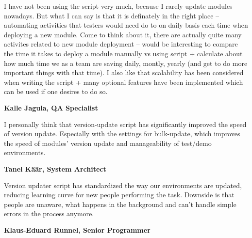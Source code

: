 \documentclass[12pt]{article}
\begin{document}
  \begin{displayquote}
  I have not been using the script very much, because I rarely update modules nowadays. But what I can say is that it is definately in the right place – automating activities that testers would need do to on daily basis each time when deploying a new module. Come to think about it, there are actually quite many activites related to new module deployment – would be interesting to compare the time it takes to deploy a module manually vs using script + calculate about how much time we as a team are saving daily, montly, yearly (and get to do more important things with that time).
I also like that scalability has been considered when writing the script + many optional features have been implemented which can be used if one desires to do so.
  \end{displayquote}

  \textbf{Kalle Jagula, QA Specialist}
  
  \begin{displayquote}
  I personally think that version-update script has significantly improved the speed of version update. Especially with the settings for bulk-update, which improves the speed of modules' version update and manageability of test/demo environments.
  \end{displayquote}
  
  \textbf{Tanel Käär, System Architect}
  
  \begin{displayquote}
  Version updater script has standardized the way our environments are updated, reducing learning curve for new people performing the task. Downside is that people are unaware, what happens in the background and can't handle simple errors in the process anymore.
  \end{displayquote}
  
  \textbf{Klaus-Eduard Runnel, Senior Programmer}
  
\end{document}
